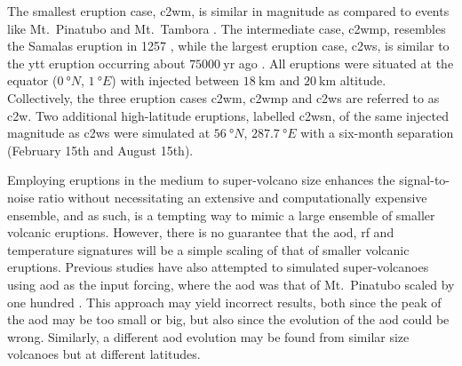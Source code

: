 \documentclass{ametsocV6.1}
\newcommand{\iso}[1][i]{{#1}njected \ce{SO2}}
\begin{document}
The smallest eruption case, \gls{c2wm}, is similar in magnitude as compared to events
like Mt.\ Pinatubo
\citep[\(\sim10\)--\(\SI{20}{\tera\gram(\ce{SO2})}\);][]{timmreck2018} and Mt.\ Tambora
\citep[\(\sim\SI{56.2}{\tera\gram(\ce{SO2})}\);][]{zanchettin2016}. The intermediate
case, \gls{c2wmp}, resembles the Samalas eruption in 1257
\citep[\(\sim{118.8}\)--\(\SI{173.1}{\tera\gram(\ce{SO2})}\);][]{toohey2017,ottobliesner2016},
while the largest eruption case, \gls{c2ws}, is similar to the \gls{ytt} eruption
occurring about \(\SI{75000}{\mathrm{yr}}\) ago
\citep[\(100\)--\(\SI{10000}{\tera\gram(\ce{SO2})}\);][]{jones2005}. All eruptions were
situated at the equator (\(\SI{0}{\degree N}\), \(\SI{1}{\degree E}\)) with 
injected between \(\SI{18}{\kilo\meter}\) and \(\SI{20}{\kilo\meter}\) altitude.
Collectively, the three eruption cases \gls{c2wm}, \gls{c2wmp} and \gls{c2ws} are
referred to as \gls{c2w}. Two additional high-latitude eruptions, labelled \gls{c2wsn},
of the same \iso{} magnitude as \gls{c2ws} were simulated at \(\SI{56}{\degree N}\),
\(\SI{287.7}{\degree E}\) with a six-month separation (February 15th and August 15th).

Employing eruptions in the medium to super-volcano size enhances the signal-to-noise
ratio without necessitating an extensive and computationally expensive ensemble, and as
such, is a tempting way to mimic a large ensemble of smaller volcanic eruptions.
However, there is no guarantee that the \gls{aod}, \gls{rf} and temperature signatures
will be a simple scaling of that of smaller volcanic eruptions. Previous studies have
also attempted to simulated super-volcanoes using \gls{aod} as the input forcing, where
the \gls{aod} was that of Mt.\ Pinatubo scaled by one hundred \citep{jones2005}. This
approach may yield incorrect results, both since the peak of the \gls{aod} may be too
small or big, but also since the evolution of the \gls{aod} could be wrong. Similarly, a
different \gls{aod} evolution may be found from similar size volcanoes but at different
latitudes.
\end{document}
